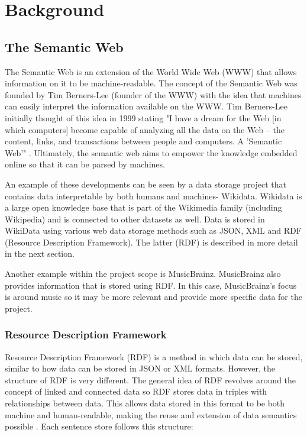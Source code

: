 \usetikzlibrary {arrows}
\usetikzlibrary {shapes.geometric}
\usetikzlibrary {patterns}

\chapter{Background}

\section{The Semantic Web}
\hspace*{0.5cm} The Semantic Web is an extension of the World Wide Web (WWW) that allows information on it to be machine-readable. \cite{semanticweb} The concept of the Semantic Web was founded by Tim Berners-Lee (founder of the WWW) with the idea that machines can easily interpret the information available on the WWW. Tim Berners-Lee initially thought of this idea in 1999 stating "I have a dream for the Web [in which computers] become capable of analyzing all the data on the Web – the content, links, and transactions between people and computers. A 'Semantic Web'" \cite{berners-TBLBook}. Ultimately, the semantic web aims to empower the knowledge embedded online so that it can be parsed by machines. \cite{semanticweb} 

An example of these developments can be seen by a data storage project that contains data interpretable by both humans and machines- Wikidata. Wikidata is a large open knowledge base that is part of the Wikimedia family (including Wikipedia) and is connected to other datasets as well. \cite{wikidata} Data is stored in WikiData using various web data storage methods such as JSON, XML and RDF (Resource Description Framework). The latter (RDF) is described in more detail in the next section.  

Another example within the project scope is MusicBrainz. MusicBrainz also provides information that is stored using RDF. \cite{musicbrainz} In this case, MusicBrainz's focus is around music so it may be more relevant and provide more specific data for the project.  

\subsection{Resource Description Framework}
\hspace*{0.5cm} Resource Description Framework (RDF) is a method in which data can be stored, similar to how data can be stored in JSON or XML formats. However, the structure of RDF is very different. The general idea of RDF revolves around the concept of linked and connected data so RDF stores data in triples with relationships between data. This allows data stored in this format to be both machine and human-readable, making the reuse and extension of data semantics possible \cite{rdf}. Each sentence store follows this structure: 

